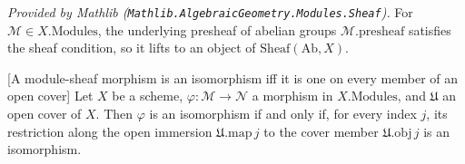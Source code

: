 \begin{lemma}
  \label{lem:modules_isSheaf_mathlib}
  \mathlibok
  \textit{Provided by Mathlib
  (\texttt{Mathlib.AlgebraicGeometry.Modules.Sheaf}).}
  For \(\mathcal{M} \in X.\mathrm{Modules}\), the underlying presheaf of abelian groups
  \(\mathcal{M}.\mathrm{presheaf}\) satisfies the sheaf condition, so it lifts to an object of
  \(\mathrm{Sheaf}(\mathrm{Ab}, X)\).
\end{lemma}

\begin{lemma}
\leanok
[A module-sheaf morphism is an isomorphism iff it is one on every member of an open cover]
  \label{lem:isIso_iff_isIso_restrict}
  Let \(X\) be a scheme, \(\varphi : \mathcal{M} \to \mathcal{N}\) a morphism in
  \(X.\mathrm{Modules}\), and \(\mathfrak{U}\) an open cover of \(X\). Then \(\varphi\) is an
  isomorphism if and only if, for every index \(j\), its restriction along the open immersion
  \(\mathfrak{U}.\mathrm{map}\,j\) to the cover member \(\mathfrak{U}.\mathrm{obj}\,j\) is
  an isomorphism.
\end{lemma}
